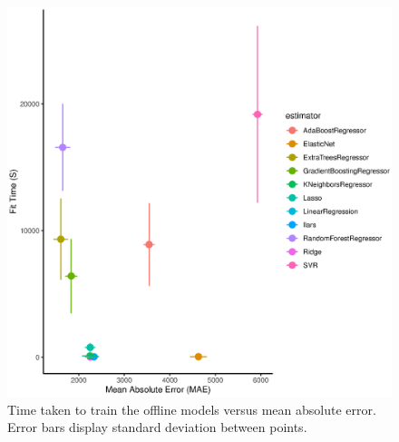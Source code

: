 \documentclass[final,3p,times,twocolumn,numbers]{elsarticle}
\begin{document}
\begin{figure}
\centering
\includegraphics[width=\columnwidth,natwidth=500,natheight=500]{figures/results/offline_fit_time_vs_mae.eps}
\caption{Time taken to train the offline models versus mean absolute error. Error bars display standard deviation between points.}
\label{fig:offline_fit_time_vs_mae}
\end{figure}
\end{document}
